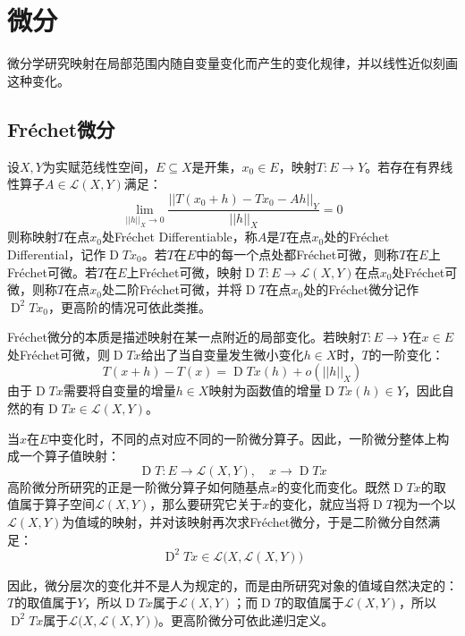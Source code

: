 \section{微分}
微分学研究映射在局部范围内随自变量变化而产生的变化规律，并以线性近似刻画这种变化。
\subsection{Fr\'echet微分}
\begin{definition}
	设$X,Y$为实赋范线性空间，$E\subseteq X$是开集，$x_0\in E$，映射$T:E\to Y$。若存在有界线性算子$A\in\mathcal{L}(X,Y)$满足：
	\begin{equation*}
		\lim_{||h||_X\to0}\frac{||T(x_0+h)-Tx_0-Ah||_Y}{||h||_X}=0
	\end{equation*}
	则称映射$T$在点$x_0$处Fr\'echet \gls{Differentiable}，称$A$是$T$在点$x_0$处的Fr\'echet \gls{Differential}，记作$\operatorname{D}Tx_0$。若$T$在$E$中的每一个点处都Fr\'echet可微，则称$T$在$E$上Fr\'echet可微。若$T$在$E$上Fr\'echet可微，映射$\operatorname{D}T:E\to\mathcal{L}(X,Y)$在点$x_0$处Fr\'echet可微，则称$T$在点$x_0$处二阶Fr\'echet可微，并将$\operatorname{D}T$在点$x_0$处的Fr\'echet微分记作$\operatorname{D}^2Tx_0$，更高阶的情况可依此类推。
\end{definition}
\begin{note}
	Fr\'echet微分的本质是描述映射在某一点附近的局部变化。若映射$T:E\to Y$在$x\in E$处Fr\'echet可微，则$\operatorname{D}Tx$给出了当自变量发生微小变化$h\in X$时，$T$的一阶变化：
	\begin{equation*}
		T(x+h)-T(x)=\operatorname{D}Tx(h)+o(||h||_X)
	\end{equation*}
	由于$\operatorname{D}Tx$需要将自变量的增量$h\in X$映射为函数值的增量$\operatorname{D}Tx(h)\in Y$，因此自然的有$\operatorname{D}Tx\in\mathcal{L}(X,Y)$。\par
	当$x$在$E$中变化时，不同的点对应不同的一阶微分算子。因此，一阶微分整体上构成一个算子值映射：
	\begin{equation*}
		\operatorname{D}T:E\to\mathcal{L}(X,Y),\quad x\to\operatorname{D}Tx
	\end{equation*}
	高阶微分所研究的正是一阶微分算子如何随基点$x$的变化而变化。既然$\operatorname{D}Tx$的取值属于算子空间$\mathcal{L}(X,Y)$，那么要研究它关于$x$的变化，就应当将$\operatorname{D}T$视为一个以$\mathcal{L}(X,Y)$为值域的映射，并对该映射再次求Fr\'echet微分，于是二阶微分自然满足：
	\begin{equation*}
		\operatorname{D}^2Tx\in\mathcal{L}\bigl(X,\mathcal{L}(X,Y)\bigr)
	\end{equation*}\par
	因此，微分层次的变化并不是人为规定的，而是由所研究对象的值域自然决定的：$T$的取值属于$Y$，所以$\operatorname{D}Tx$属于$\mathcal{L}(X,Y)$；而$\operatorname{D}T$的取值属于$\mathcal{L}(X,Y)$，所以$\operatorname{D}^2Tx$属于$\mathcal{L}\bigl(X,\mathcal{L}(X,Y)\bigr)$。更高阶微分可依此递归定义。
\end{note}
